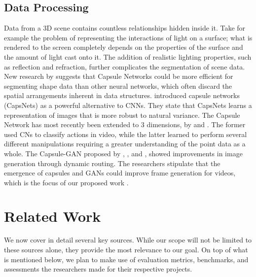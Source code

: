 \documentclass{article}
\begin{document}
\subsection{Data Processing}
\label{subsec:data_processing}
Data from a 3D scene contains countless relationships hidden inside it.
Take for example the problem of representing the
interactions of light on a surface;
what is rendered to the screen completely depends on
the properties of the surface and the amount of light cast onto it.
The addition of realistic lighting properties, such as reflection and refraction,
further complicates the segmentation of scene data.
New research by \cite{3D_capsule_networks} suggests that
Capsule Networks could be more efficient for segmenting shape data
than other neural networks, which
often discard the spatial arrangements inherent in data structures.
\cite{dynamic_routing} introduced capsule networks (CapsNets) as a powerful
alternative to CNNs. They state that CapsNets learns
a representation of images that is more robust to natural variance.
The Capsule Network has most recently been extended to 3 dimensions, by
\cite{video_capsule} and \cite{3D_capsule_networks}.
The former used CNs to classify actions in video,
while the latter learned to perform several different manipulations
requiring a greater understanding of the point data as a whole.
The Capsule-GAN proposed by \cite{capsule_synthesis}, \cite{capsgan},
and \cite{capsule_gan},
showed improvements in image generation through dynamic routing.
The researchers stipulate that the emergence of capsules and GANs could improve
frame generation for videos, which is the focus of our proposed work
\cite{capsgan}.

\section{Related Work}
\label{sec:related}
We now cover in detail several key sources.
While our scope will not be limited to these sources alone,
they provide the most relevance to our goal. On top of what is mentioned below,
we plan to make use of evaluation metrics, benchmarks, and assessments the
researchers made for their respective projects.
\end{document}
